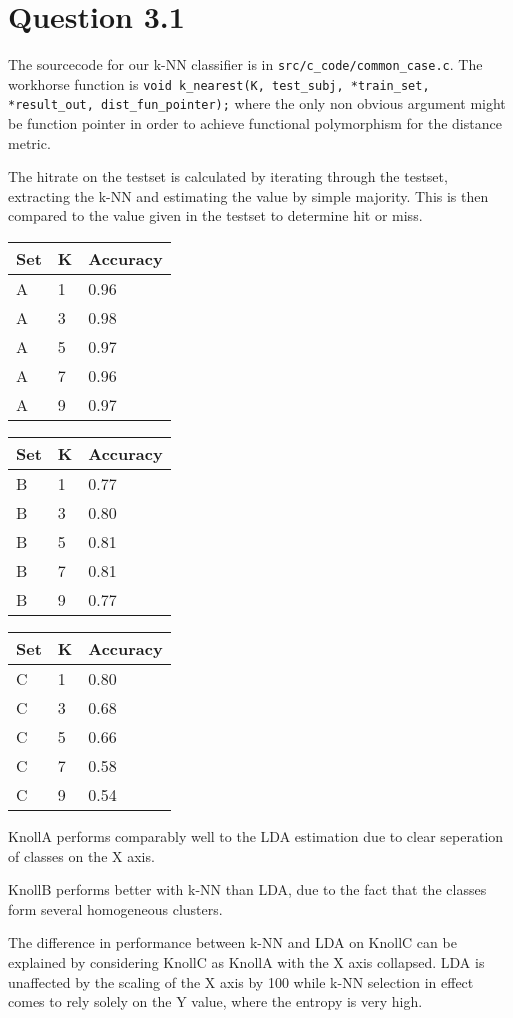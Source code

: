 \section*{Question 3.1}
The sourcecode for our k-NN classifier is in \texttt{src/c\_code/common\_case.c}. The workhorse function is 
\texttt{void k\_nearest(K, test\_subj, *train\_set, *result\_out, dist\_fun\_pointer);}
where the only non obvious argument might be function pointer in order to achieve functional polymorphism for the distance metric.

The hitrate on the testset is calculated by iterating through the testset, extracting the k-NN and estimating the value by simple majority. This is then compared to the value given in the testset to determine hit or miss.

\begin{tabular}{|l|l|l|}
  \textbf{Set}  & \textbf{K}  & \textbf{Accuracy}  \\\hline
  A & 1 & 0.96 \\\hline 
  A & 3 & 0.98 \\\hline 
  A & 5 & 0.97 \\\hline 
  A & 7 & 0.96 \\\hline 
  A & 9 & 0.97 \\\hline 
\end{tabular}

\begin{tabular}{|l|l|l|}
  \textbf{Set}  & \textbf{K}  & \textbf{Accuracy}  \\\hline
  B & 1 & 0.77 \\\hline 
  B & 3 & 0.80 \\\hline 
  B & 5 & 0.81 \\\hline 
  B & 7 & 0.81 \\\hline 
  B & 9 & 0.77 \\\hline 
\end{tabular}

\begin{tabular}{|l|l|l|}
  \textbf{Set}  & \textbf{K}  & \textbf{Accuracy}  \\\hline
  C & 1 & 0.80 \\\hline 
  C & 3 & 0.68 \\\hline 
  C & 5 & 0.66 \\\hline 
  C & 7 & 0.58 \\\hline 
  C & 9 & 0.54 \\\hline 
\end{tabular}

KnollA performs comparably well to the LDA estimation due to clear seperation of classes on the X axis. 

KnollB performs better with k-NN than LDA, due to the fact that the classes form several homogeneous clusters.

The difference in performance between k-NN and LDA on KnollC can be explained by considering KnollC as KnollA with the X axis collapsed. LDA is unaffected by the scaling of the X axis by 100 while k-NN selection in effect comes to rely solely on the Y value, where the entropy is very high. 
